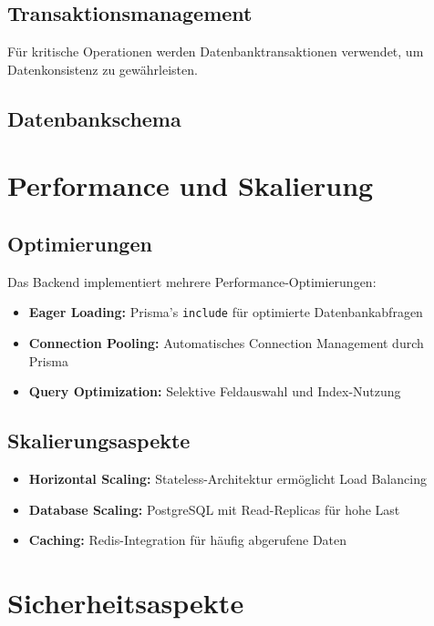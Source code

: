 \subsection{Transaktionsmanagement}

Für kritische Operationen werden Datenbanktransaktionen verwendet, um Datenkonsistenz zu gewährleisten.

\subsection{Datenbankschema}


\section{Performance und Skalierung}

\subsection{Optimierungen}

Das Backend implementiert mehrere Performance-Optimierungen:

\begin{itemize}
    \item \textbf{Eager Loading:} Prisma's \texttt{include} für optimierte Datenbankabfragen
    \item \textbf{Connection Pooling:} Automatisches Connection Management durch Prisma
    \item \textbf{Query Optimization:} Selektive Feldauswahl und Index-Nutzung
\end{itemize}

\subsection{Skalierungsaspekte}

\begin{itemize}
    \item \textbf{Horizontal Scaling:} Stateless-Architektur ermöglicht Load Balancing
    \item \textbf{Database Scaling:} PostgreSQL mit Read-Replicas für hohe Last
    \item \textbf{Caching:} Redis-Integration für häufig abgerufene Daten
\end{itemize}

\section{Sicherheitsaspekte}

